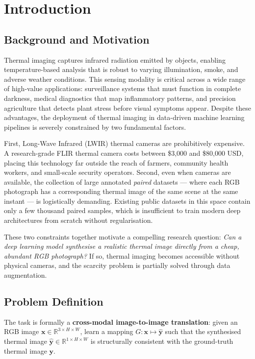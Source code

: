 \chapter{Introduction}
\label{Chapter1}

\section{Background and Motivation}

Thermal imaging captures infrared radiation emitted by objects, enabling temperature-based analysis that is robust to varying illumination, smoke, and adverse weather conditions. This sensing modality is critical across a wide range of high-value applications: surveillance systems that must function in complete darkness, medical diagnostics that map inflammatory patterns, and precision agriculture that detects plant stress before visual symptoms appear. Despite these advantages, the deployment of thermal imaging in data-driven machine learning pipelines is severely constrained by two fundamental factors.

First, Long-Wave Infrared (LWIR) thermal cameras are prohibitively expensive. A research-grade FLIR thermal camera costs between \$3,000 and \$80,000 USD, placing this technology far outside the reach of farmers, community health workers, and small-scale security operators. Second, even when cameras are available, the collection of large annotated \emph{paired} datasets --- where each RGB photograph has a corresponding thermal image of the same scene at the same instant --- is logistically demanding. Existing public datasets in this space contain only a few thousand paired samples, which is insufficient to train modern deep architectures from scratch without regularisation.

These two constraints together motivate a compelling research question: \emph{Can a deep learning model synthesise a realistic thermal image directly from a cheap, abundant RGB photograph?} If so, thermal imaging becomes accessible without physical cameras, and the scarcity problem is partially solved through data augmentation.

\section{Problem Definition}

The task is formally a \textbf{cross-modal image-to-image translation}: given an RGB image $\mathbf{x} \in \mathbb{R}^{3 \times H \times W}$, learn a mapping $G: \mathbf{x} \mapsto \hat{\mathbf{y}}$ such that the synthesised thermal image $\hat{\mathbf{y}} \in \mathbb{R}^{1 \times H \times W}$ is structurally consistent with the ground-truth thermal image $\mathbf{y}$.

